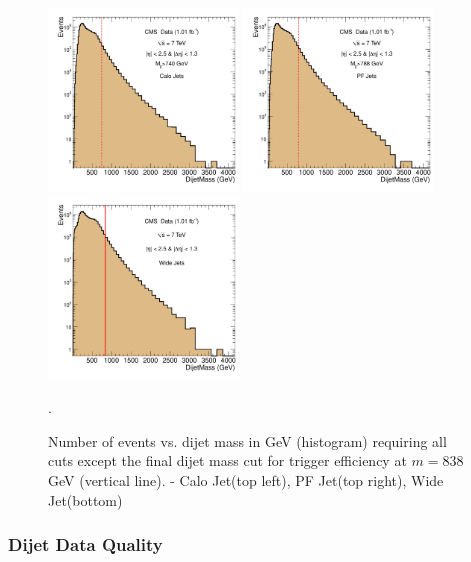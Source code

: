 \begin{figure}[!ht]
  \begin{center}
    \includegraphics[width=0.45\textwidth]{Figures/c_TurnOver_calo.pdf}
    \includegraphics[width=0.45\textwidth]{Figures/c_TurnOver_pf.pdf}
    \includegraphics[width=0.45\textwidth]{Figures/c_TurnOver_fat.pdf}
   \caption{ Number of events vs. dijet mass in GeV (histogram)
   requiring all cuts except the final dijet mass cut for trigger
   efficiency at $m=838$ GeV (vertical line). - Calo Jet(top left), PF Jet(top right), Wide Jet(bottom) }.
    \label{MassCut}
  \end{center}
\end{figure}
\clearpage
\subsubsection{Dijet Data Quality}

